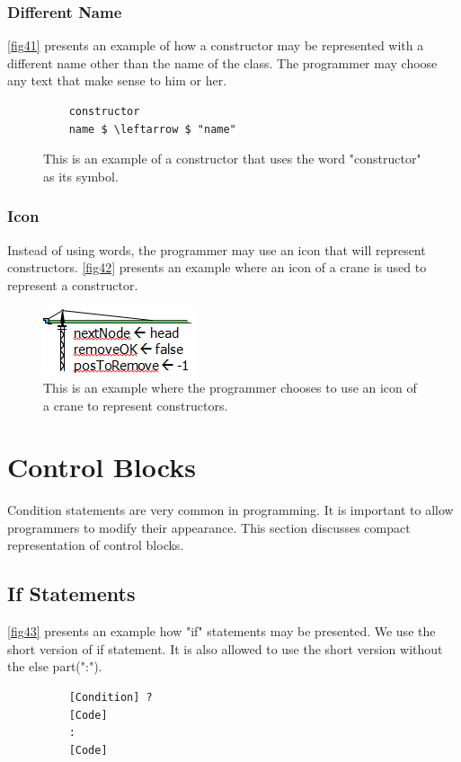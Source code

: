\subsubsection{Different Name}
\autoref{fig41} presents an example of how a constructor may be represented with a different name other than the name of the class. The programmer may choose any text that make sense to him or her.
\begin{figure}[H]
	\begin{lstlisting}
	constructor
	name $ \leftarrow $ "name"
	\end{lstlisting}
	\caption{This is an example of a constructor that uses the word "constructor" as its symbol.}
	\label{fig41}
\end{figure}
\subsubsection{Icon}
Instead of using words, the programmer may use an icon that will represent constructors. \autoref{fig42} presents an example where an icon of a crane is used to represent a constructor.
\begin{figure}[H]
	\includegraphics{"./fig/Crane Constructor"}
	\caption{This is an example where the programmer chooses to use an icon of a crane to represent constructors.}
	\label{fig42}
\end{figure}
\section{Control Blocks}
Condition statements are very common in programming. It is important to allow programmers to modify their appearance. This section discusses compact representation of control blocks.
\subsection{If Statements}
\autoref{fig43} presents an example how "if" statements may be presented. We use the short version of if statement. It is also allowed to use the short version without the else part(":").
\begin{figure}[H]
	\begin{lstlisting}
	[Condition] ?
	[Code]
	:
	[Code]
	\end{lstlisting}
	\caption{}
	\label{fig43}
\end{figure}
